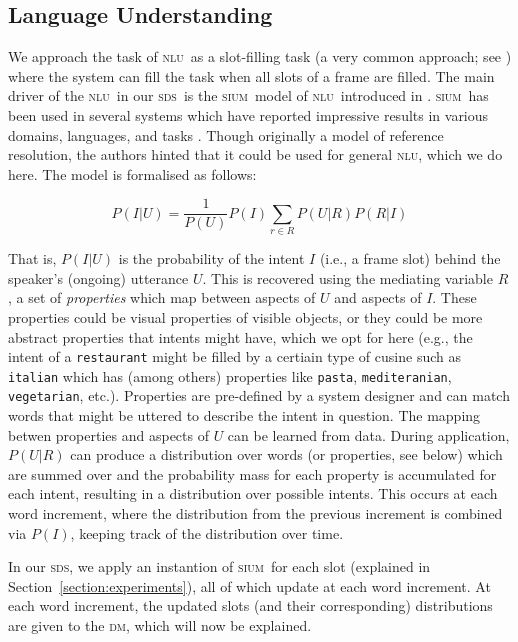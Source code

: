\documentclass[11pt]{article}
\newcommand{\sds}[0]{\textsc{sds}}
\newcommand{\nlu}[0]{\textsc{nlu}}
\newcommand{\sium}[0]{\textsc{sium}}
\newcommand{\dm}[0]{\textsc{dm}}
\begin{document}
\subsection{Language Understanding}

We approach the task of \nlu\ as a slot-filling task (a very common approach; see \cite{Tur2012}) where the system can fill the task when all slots of a frame are filled. The main driver of the \nlu\ in our \sds\ is the \sium\ model of \nlu\ introduced in \cite{Kennington2013a}. \sium\ has been used in several systems which have reported impressive results in various domains, languages, and tasks \cite{Kennington2014_coling,Kennington2015_naacl}. Though originally a model of reference resolution, the authors hinted that it could be used for general \nlu, which we do here. The model is formalised as follows:

\begin{center}
\begin{equation}
   P(I|U) = \frac{1}{P(U)} P(I)\sum_{r\in R} P(U|R)P(R|I) 
\label{eq:disc1}
\end{equation}
\end{center}

That is, $P(I|U)$ is the probability of the intent $I$ (i.e., a frame slot) behind the speaker's (ongoing) utterance $U$. This is recovered using the mediating variable $R$, a set of \emph{properties} which map between aspects of $U$ and aspects of $I$. These properties could be visual properties of visible objects, or they could be more abstract properties that intents might have, which we opt for here (e.g., the intent of a \texttt{restaurant} might be filled by a certiain type of cusine such as \texttt{italian} which has (among others) properties like \texttt{pasta}, \texttt{mediteranian}, \texttt{vegetarian}, etc.). Properties are pre-defined by a system designer and can match words that might be uttered to describe the intent in question. The mapping betwen properties and aspects of $U$ can be learned from data. During application, $P(U|R)$ can produce a distribution over words (or properties, see below) which are summed over and the probability mass for each property is accumulated for each intent, resulting in a distribution over possible intents. This occurs at each word increment, where the distribution from the previous increment is combined via $P(I)$, keeping track of the distribution over time.  

In our \sds, we apply an instantion of \sium\ for each slot (explained in Section~\ref{section:experiments}), all of which update at each word increment. At each word increment, the updated slots (and their corresponding) distributions are given to the \dm, which will now be explained. 
\end{document}
